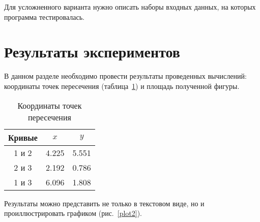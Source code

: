 \documentclass[a4paper,12pt,titlepage,finall]{article}
\begin{document}
Для усложненного варианта нужно описать наборы входных данных, на которых
программа тестировалась.

\newpage

\section{Результаты экспериментов}

В данном разделе необходимо провести результаты проведенных вычислений:
координаты точек пересечения (таблица~\ref{table1}) и площадь полученной фигуры.

\begin{table}[h]
\centering
\begin{tabular}{|c|c|c|}
\hline
Кривые & $x$ & $y$ \\
\hline
1 и 2 &  4.225 & 5.551 \\
2 и 3 &  2.192 & 0.786 \\
1 и 3 & 6.096 & 1.808 \\
\hline
\end{tabular}
\caption{Координаты точек пересечения}
\label{table1}
\end{table}


Результаты можно представить не только в текстовом виде, но и 
проиллюстрировать графиком (рис.~\ref{plot2}).
\end{document}
